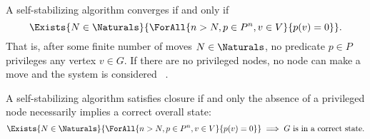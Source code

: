 A self-stabilizing algorithm converges if and only if
\begin{equation}
  \label{eq:define-ssalg:converge}
  \Exists{N \in \Naturals}{\ForAll{n > N, p \in P^n, v \in V}{p(v) = 0}}.
\end{equation}
That is, after some finite number of moves $N \in \Naturals$,
  no predicate $p \in P$ privileges any vertex $v \in G$.
If there are no privileged nodes, no node can make a move and
  the system is considered ~\autocite{Dijkstra:1974:SSS:361179.361202}.

A self-stabilizing algorithm satisfies closure if and only
  the absence of a privileged node necessarily implies a correct overall state:
\begin{equation}
  \label{eq:define-ssalg:closure}
  \Exists{N \in \Naturals}{\ForAll{n > N, p \in P^n, v \in V}{p(v) = 0}}
  \implies \text{$G$ is in a correct state}.
\end{equation}

